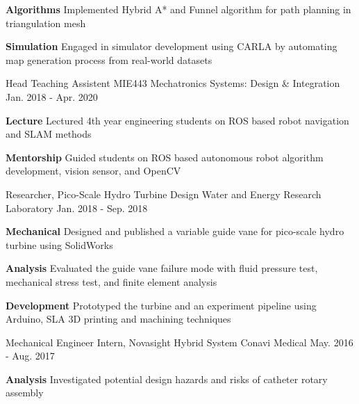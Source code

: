 \begin{cventries}
{\begin{cvitems}
{				\textbf{Algorithms} Implemented Hybrid A* and Funnel algorithm for path planning in triangulation mesh
			}
			\item {
				\textbf{Simulation} Engaged in simulator development using CARLA by automating map generation process from real-world datasets
			}
		\end{cvitems}
	}
	\cventry
	{Head Teaching Assistent}
	{MIE443 Mechatronics Systems: Design \& Integration}
	{Jan. 2018 - Apr. 2020}
	{}
	{
		\begin{cvitems}
			\item {
				\textbf{Lecture} Lectured 4th year engineering students on ROS based robot navigation and SLAM methods
			}
			\item {
				\textbf{Mentorship} Guided students on ROS based autonomous robot algorithm development, vision sensor, and OpenCV
			}
		\end{cvitems}
	}
	\cventry
	{Researcher, Pico-Scale Hydro Turbine Design}
	{Water and Energy Research Laboratory}
	{Jan. 2018 - Sep. 2018}
	{}
	{
		\begin{cvitems}
			\item {\textbf{Mechanical} Designed and published a variable guide vane for pico-scale hydro turbine using SolidWorks}
			\item {\textbf{Analysis} Evaluated the guide vane failure mode with fluid pressure test, mechanical stress test, and finite element analysis}
			\item {\textbf{Development} Prototyped the turbine and an experiment pipeline using Arduino, SLA 3D printing and machining techniques}
		\end{cvitems}
	}
	\cventry
	{Mechanical Engineer Intern, Novasight Hybrid System}
	{Conavi Medical} 
	{May. 2016 - Aug. 2017}
	{}
	{
		\begin{cvitems}
			\item {
				\textbf{Analysis} Investigated potential design hazards and risks of catheter rotary assembly
			}
			\item {
}
\end{cvitems}}
\end{cventries}
